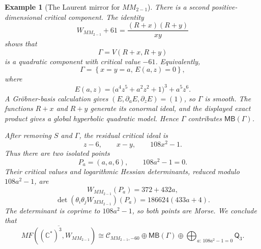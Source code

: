 \documentclass[11pt]{amsart}
\newtheorem{example}{Example}[section]
\newcommand{\MorseCat}[1]{\mathsf{Q}_{#1}}
\newcommand{\MBcat}[1]{\mathsf{MB}(#1)}
\begin{document}
\begin{example}[The Laurent mirror for $MM_{2-1}$]
There is a second positive-dimensional critical component.  The identity
\[
W_{MM_{2-1}}+61
=\frac{(R+x)(R+y)}{xy}
\]
shows that
\[
\Gamma=V(R+x,R+y)
\]
is a quadratic component with critical value $-61$.  Equivalently,
\[
\Gamma=\left\{x=y=a,\,
E(a,z)=0\right\},
\]
where
\[
E(a,z)=\bigl(a^4z^5+a^2z^2+1\bigr)^3+a^5z^6.
\]
A Gr\"obner-basis calculation gives
$(E,\partial_aE,\partial_zE)=(1)$, so $\Gamma$ is smooth.  The functions
$R+x$ and $R+y$ generate its conormal ideal, and the displayed exact product
gives a global hyperbolic quadratic model.  Hence $\Gamma$ contributes
$\MBcat{\Gamma}$.

After removing $S$ and $\Gamma$, the residual critical ideal is
\[
z-6,
\qquad
x-y,
\qquad
108x^2-1.
\]
Thus there are two isolated points
\[
P_a=(a,a,6),
\qquad
108a^2-1=0.
\]
Their critical values and logarithmic Hessian determinants, reduced modulo
$108a^2-1$, are
\[
W_{MM_{2-1}}(P_a)=372+432a,
\]
\[
\det(\theta_i\theta_jW_{MM_{2-1}})(P_a)
=186624(433a+4).
\]
The determinant is coprime to $108a^2-1$, so both points are Morse.  We
conclude that
\[
\overline{MF((\mathbb C^*)^3,W_{MM_{2-1}})}
\cong
\mathcal C_{MM_{2-1},-60}
\oplus\MBcat{\Gamma}
\oplus
\bigoplus_{a:\,108a^2-1=0}\MorseCat{3}.
\]
\end{example}
\end{document}
